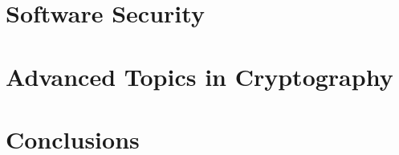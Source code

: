 \documentclass[
letterpaper, %
oneside,
nobib
]{tufte-book}
\begin{document}
\part{Software Security}

 
% 


\part{Advanced Topics in Cryptography}



\part{Conclusions}


\backmatter

\printbibliography
\end{document}
